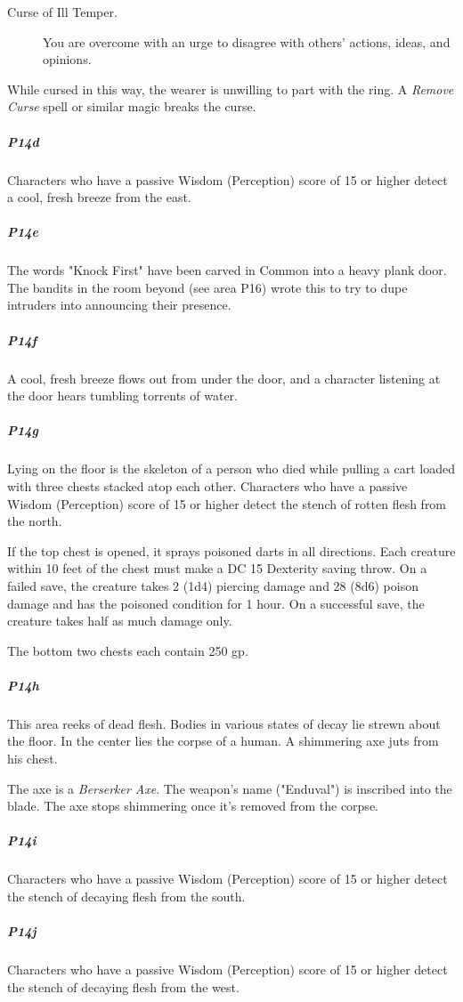 \documentclass[10pt,a4paper,twoside,bg=print,twocolumn,openany,nodeprecatedcode]{dndbook}
\begin{document}
\begin{description}
\item[Curse of Ill Temper.]
You are overcome with an urge to disagree with others' actions, ideas, and opinions.
\end{description}

While cursed in this way, the wearer is unwilling to part with the ring. A \textit{Remove Curse} spell or similar magic breaks the curse.

\subparagraph{P14d}
Characters who have a passive Wisdom (Perception) score of 15 or higher detect a cool, fresh breeze from the east.

\subparagraph{P14e}
The words "Knock First" have been carved in Common into a heavy plank door. The bandits in the room beyond (see area P16) wrote this to try to dupe intruders into announcing their presence.

\subparagraph{P14f}
A cool, fresh breeze flows out from under the door, and a character listening at the door hears tumbling torrents of water.

\subparagraph{P14g}
Lying on the floor is the skeleton of a person who died while pulling a cart loaded with three chests stacked atop each other. Characters who have a passive Wisdom (Perception) score of 15 or higher detect the stench of rotten flesh from the north.

If the top chest is opened, it sprays poisoned darts in all directions. Each creature within 10 feet of the chest must make a DC 15 Dexterity saving throw. On a failed save, the creature takes 2 (1d4) piercing damage and 28 (8d6) poison damage and has the poisoned condition for 1 hour. On a successful save, the creature takes half as much damage only.

The bottom two chests each contain 250 gp.

\subparagraph{P14h}
This area reeks of dead flesh. Bodies in various states of decay lie strewn about the floor. In the center lies the corpse of a human. A shimmering axe juts from his chest.

The axe is a \textit{Berserker Axe}. The weapon's name ("Enduval") is inscribed into the blade. The axe stops shimmering once it's removed from the corpse.

\subparagraph{P14i}
Characters who have a passive Wisdom (Perception) score of 15 or higher detect the stench of decaying flesh from the south.

\subparagraph{P14j}
Characters who have a passive Wisdom (Perception) score of 15 or higher detect the stench of decaying flesh from the west.
\end{document}
